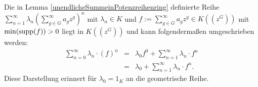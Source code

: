 %
%
%
%
%
%
%
%
%
%
%
%
%
%
%
%
%
%
%
%
%
%
%
%
\begin{bem}
Die in Lemma \ref{unendlicheSummeinPotenzreihenring} definierte Reihe $\sum_{n=1}^{\infty}\lambda_n{\left(\sum_{g \in G}^{\infty}a_g z^g\right)}^n$ mit $\lambda_n \in K$ und $f:= \sum_{g \in G}^{\infty}a_g z^g \in K\left(\left(z^{G}\right)\right)$ mit $\min(\textup{supp}(f)) > 0$ liegt in $K\left(\left(z^{G}\right)\right)$ und kann folgendermaßen umgeschrieben werden:
\begin{eqnarray*}
\sum_{n=0}^{\infty}\lambda_n\cdot \left(f\right)^n &=& \lambda_0 f^0 + \sum_{n=1}^{\infty}\lambda_n\cdot f^n \\
&=& \lambda_0 + \sum_{n=1}^{\infty}\lambda_n\cdot f^n.
\end{eqnarray*}
%
%
%
Diese Darstellung erinnert für $\lambda_0 = 1_K$ an die geometrische Reihe. 
%
%
%
\end{bem}
%
%
%
%
%
%
%
 

